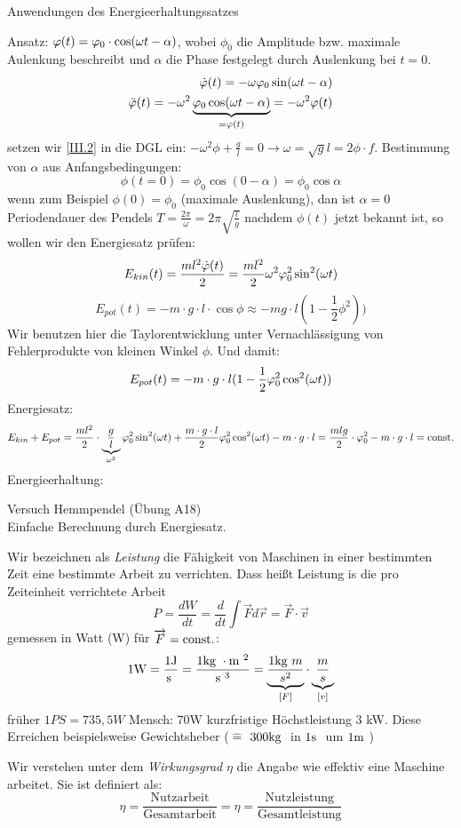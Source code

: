 \documentclass[a4paper,10pt]{scrartcl}
\begin{document}
\begin{seg}{Anwendungen des Energieerhaltungssatzes}
\begin{enumerate}[a)]
Ansatz: $\varphi(t)=\varphi_0\cdot \cos(\omega t-\alpha)$, wobei $\phi_0$ die Amplitude bzw. maximale Aulenkung beschreibt und $\alpha$ die Phase festgelegt durch Auslenkung bei $t=0$.
\begin{align}
 \dot {\varphi}(t)=-\omega\varphi_0\sin(\omega t - \alpha)\label{II.2}\\
 \ddot {\varphi}(t)=-\omega^2\underbrace{\varphi_0\cos(\omega t-\alpha)}_{=\varphi(t)}=-\omega^2\varphi(t)\label{III.2}
\end{align}
setzen wir \ref{III.2} in die DGL ein: $-\omega^2\phi+\frac{g}{l}=0\rightarrow \omega=\sqrt{g}{l}=2\phi\cdot f$.
Bestimmung von $\alpha$ aus Anfangsbedingungen:
\[
 \phi(t=0)=\phi_0\cos(0-\alpha)=\phi_0\cos\alpha
\]
wenn zum Beispiel $\phi(0)=\phi_0$ (maximale Auslenkung), dan ist $\alpha=0$ Periodendauer des Pendels $T=\frac{2\pi}{\omega}=2\pi\sqrt{\frac{l}{g}}$
nachdem $\phi(t)$ jetzt bekannt ist, so wollen wir den Energiesatz prüfen:
\[
 E_{kin}(t)=\frac{ml^2\dot {\varphi}(t)}2=\frac{ml^2}2 \omega^2 \varphi_0^2 \sin^2(\omega t)
\]
\[
 E_{pot}(t)=-m\cdot g\cdot l\cdot \cos{\phi}\approx-mg\cdot l(1-\frac{1}{2}\phi^2))
\]
Wir benutzen hier die Taylorentwicklung unter Vernachlässigung von Fehlerprodukte von kleinen Winkel $\phi$. Und damit:
\[
 E_{pot}(t)=-m\cdot g\cdot l(1-\frac 1 2 \varphi_0^2\cos^2(\omega t))
\]
Energiesatz:
\[
 E_{kin}+E_{pot}=\frac{ml^2}{2}\cdot \underbrace{\frac{g}{l}}_{\omega^2}\varphi_0^2 \sin^2(\omega t)+\frac{m\cdot g\cdot l}2 \varphi_0^2\cos^2(\omega t)-m\cdot g\cdot l=\frac{mlg}{2}\cdot \varphi_0^2-m\cdot g \cdot l = \text{const}.
\]
Energieerhaltung:\\
\begin{seg}{Versuch Hemmpendel (Übung A18)}
\\
Einfache Berechnung durch Energiesatz. \\
\begin{df}
Wir bezeichnen als \emph{Leistung} die Fähigkeit von Maschinen in einer bestimmten Zeit eine bestimmte Arbeit zu verrichten. Dass heißt Leistung is die pro Zeiteinheit verrichtete Arbeit
\[
 P=\frac{dW}{dt}=\frac{d}{dt}\int \vec F d\vec{r}=\vec F\cdot \vec v
\]
gemessen in Watt (W) für $\overrightarrow{F}=\text{const}.$:
\[
 1\text{W}=\frac{1\text{J}}{\text{s }}=\frac{1\text{kg }\cdot \text{m }^2}{\text{s }^3}=\underbrace{\frac{1\text{kg } m}{s^2}}_{[F]}\cdot \underbrace{\frac{m}{s}}_{[v]}
\]
früher $1PS=735,5 W$ 
Mensch: $70\text{W}$ kurzfristige Höchstleistung $3$ kW. Diese Erreichen beispielsweise Gewichtsheber ($\hat=$ $300\text{kg }$ in $1\text{s }$ um $1\text{m }$)\\
\end{df}
\begin{df}[Wirkungsgrad]
Wir verstehen unter dem \emph{Wirkungsgrad} $\eta$ die Angabe wie effektiv eine Maschine arbeitet. Sie ist definiert als:
\[
 \eta=\frac{\text{Nutzarbeit}}{\text{Gesamtarbeit}}=\eta=\frac{\text{Nutzleistung}}{\text{Gesamtleistung}}
\]
\end{df}
\end{seg}

\end{enumerate}
\end{seg}
\end{document}
